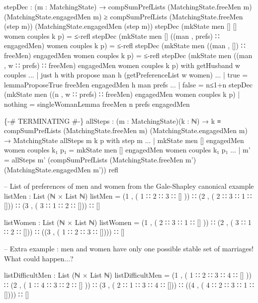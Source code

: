 \documentclass{article}
\begin{document}
\begin{code}
{stepDec : (m : MatchingState) → compSumPrefLists (MatchingState.freeMen m) (MatchingState.engagedMen m) ≥ compSumPrefLists (MatchingState.freeMen (step m)) (MatchingState.engagedMen (step m))
stepDec (mkState men [] [] women couples k p) = ≤-refl
stepDec (mkState men [] ((man , prefs) ∷ engagedMen) women couples k p) = ≤-refl
stepDec (mkState men ((man , []) ∷ freeMen) engagedMen women couples k p) = ≤-refl
stepDec (mkState men ((man , w ∷ prefs) ∷ freeMen) engagedMen women couples k p) with getHusband w couples
...             | just h with propose man h (getPreferenceList w women)
...             | true  = lemmaProposeTrue freeMen engagedMen h man prefs 
...             | false = n≤1+n \AgdaUnderscore{}
stepDec (mkState men ((n , w ∷ prefs) ∷ freeMen) engagedMen women couples k p) | nothing = singleWomanLemma freeMen n prefs engagedMen

\{-\# TERMINATING \#-\}
allSteps : (m : MatchingState)(k : ℕ) → k ≡ compSumPrefLists (MatchingState.freeMen m) (MatchingState.engagedMen m) → MatchingState
allSteps m k p with step m
... | mkState men [] engagedMen women couples k₁ p₁ = mkState men [] engagedMen women couples k₁ p₁
... | m' = allSteps m' (compSumPrefLists (MatchingState.freeMen m') (MatchingState.engagedMen m')) refl

-- List of preferences of men and women from the Gale-Shapley canonical example
listMen : List (ℕ × List ℕ)
listMen = (1 , ( 1 ∷ 2 ∷ 3 ∷ [] )) ∷ (2 , ( 2 ∷ 3 ∷ 1 ∷ [])) ∷ (3 , ( 3 ∷ 1 ∷ 2 ∷ [])) ∷ []

listWomen : List (ℕ × List ℕ)
listWomen = (1 , ( 2 ∷ 3 ∷ 1 ∷ [] )) ∷ (2 , ( 3 ∷ 1 ∷ 2 ∷ [])) ∷ ((3 , ( 1 ∷ 2 ∷ 3 ∷ []))) ∷ []

-- Extra example : men and women have only one possible stable set of marriages! What could happen...?

listDifficultMen : List (ℕ × List ℕ)
listDifficultMen = (1 , ( 1 ∷ 2 ∷ 3 ∷ 4 ∷ [] )) ∷ (2 , ( 1 ∷ 4 ∷ 3 ∷ 2 ∷ [] )) ∷ (3 , ( 2 ∷ 1 ∷ 3 ∷ 4 ∷ [])) ∷ ((4 , ( 4 ∷ 2 ∷ 3 ∷ 1 ∷ []))) ∷ []

}
\end{code}
\end{document}
